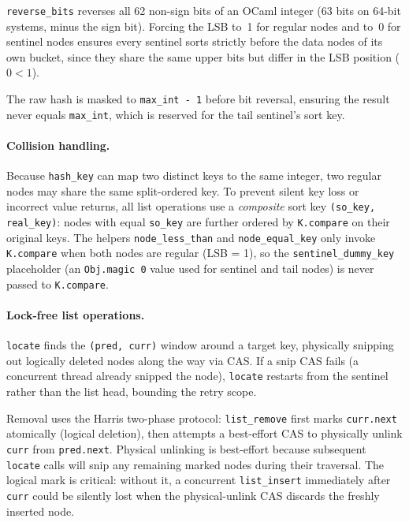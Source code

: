 \documentclass[11pt,a4paper]{article}
\begin{document}
\texttt{reverse\_bits} reverses all 62 non-sign bits of an OCaml integer (63
bits on 64-bit systems, minus the sign bit). Forcing the LSB to~1 for regular
nodes and to~0 for sentinel nodes ensures every sentinel sorts strictly before
the data nodes of its own bucket, since they share the same upper bits but
differ in the LSB position ($0 < 1$).

The raw hash is masked to \texttt{max\_int - 1} before bit reversal, ensuring
the result never equals \texttt{max\_int}, which is reserved for the tail
sentinel's sort key.

\paragraph{Collision handling.}
Because \texttt{hash\_key} can map two distinct keys to the same integer, two
regular nodes may share the same split-ordered key. To prevent silent key
loss or incorrect value returns, all list operations use a \emph{composite}
sort key \texttt{(so\_key, real\_key)}: nodes with equal \texttt{so\_key} are
further ordered by \texttt{K.compare} on their original keys. The helpers
\texttt{node\_less\_than} and \texttt{node\_equal\_key} only invoke
\texttt{K.compare} when both nodes are regular (LSB = 1), so the
\texttt{sentinel\_dummy\_key} placeholder (an \texttt{Obj.magic 0} value used
for sentinel and tail nodes) is never passed to \texttt{K.compare}.

\paragraph{Lock-free list operations.}
\texttt{locate} finds the \texttt{(pred, curr)} window around a target key,
physically snipping out logically deleted nodes along the way via CAS. If a
snip CAS fails (a concurrent thread already snipped the node), \texttt{locate}
restarts from the sentinel rather than the list head, bounding the retry scope.

Removal uses the Harris two-phase protocol: \texttt{list\_remove}
first marks \texttt{curr.next} atomically (logical deletion), then attempts a
best-effort CAS to physically unlink \texttt{curr} from \texttt{pred.next}.
Physical unlinking is best-effort because subsequent \texttt{locate} calls will
snip any remaining marked nodes during their traversal. The logical mark is
critical: without it, a concurrent \texttt{list\_insert} immediately after
\texttt{curr} could be silently lost when the physical-unlink CAS discards the
freshly inserted node.
\end{document}
